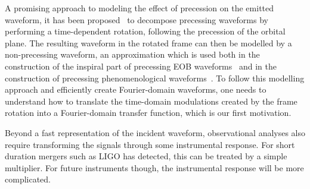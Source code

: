 \documentclass[aps,showpacs,twocolumn,
prd,superscriptaddress,nofootinbib]{revtex4-1}
\newcommand{\jgb}[1]{{\color{DarkGreen} #1}}
\begin{document}
A promising approach to modeling the effect of precession on the emitted waveform, it has been proposed~\cite{BCV03b, BCPTV05, Schmidt+10, OShaughnessy+11, Boyle+11} to decompose precessing waveforms by performing a time-dependent rotation, following the precession of the orbital plane. The resulting waveform in the rotated frame can then be modelled by a non-precessing waveform, an approximation which is used both in the construction of the inspiral part of precessing EOB waveforms~\cite{Pan+13} and in the construction of precessing phenomenological waveforms~\cite{Hannam+13}. To follow this modelling approach and efficiently create Fourier-domain waveforms, one needs to understand how to translate the time-domain modulations created by the frame rotation into a Fourier-domain transfer function, which is our first motivation.

Beyond a fast representation of the incident waveform, observational analyses also require transforming the signals through some instrumental response. For short duration mergers such as LIGO  has detected, this can be treated by a simple multiplier.  For future instruments though, the instrumental response will be more complicated.

\end{document}
